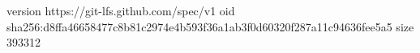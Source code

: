 version https://git-lfs.github.com/spec/v1
oid sha256:d8ffa46658477c8b81c2974e4b593f36a1ab3f0d60320f287a11c94636fee5a5
size 393312
